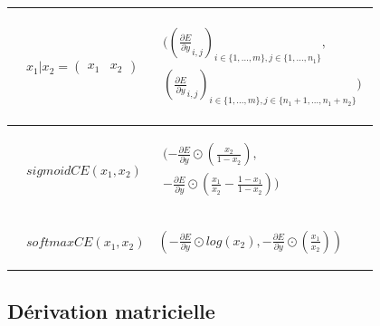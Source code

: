 \begin{center}
\begin{tabular}{|m{3.5cm}|m{2.9cm}|m{5.2cm}|}
\hline
\begin{center}\end{center} & \begin{center}$x_1|x_2 = \begin{pmatrix}x_1 & x_2\end{pmatrix}$\end{center} & \begin{center}$\begin{array}{l}((\frac{\partial E}{\partial y}_{i, j})_{i \in \{1, ..., m\}, j \in \{1, ..., n_1\}}, \\ (\frac{\partial E}{\partial y}_{i, j})_{i \in \{1, ..., m\}, j \in \{n_1+1, ..., n_1+n_2\}})\end{array} $\end{center} \\
\hline
\begin{center}\end{center} & \begin{center}$sigmoidCE(x_1, x_2)$\end{center} & \begin{center}$\begin{array}{l}(-\frac{\partial E}{\partial y} \odot \left(\frac{x_2}{1-x_2}\right), \\ -\frac{\partial E}{\partial y} \odot \left(\frac{x_1}{x_2} - \frac{1-x_1}{1-x_2}\right))\end{array}$\end{center} \\
\hline
\begin{center}\end{center} & \begin{center}$softmaxCE(x_1, x_2)$\end{center} & \begin{center}$(-\frac{\partial E}{\partial y} \odot log(x_2), -\frac{\partial E}{\partial y} \odot \left(\frac{x_1}{x_2}\right))$\end{center} \\
\hline
\end{tabular}
\end{center}

\subsection{Dérivation matricielle}

